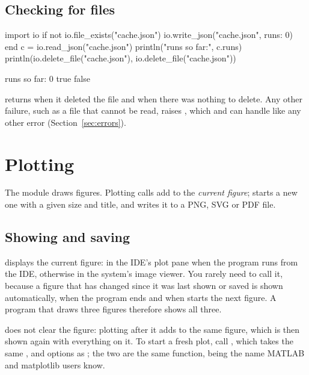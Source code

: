 \documentclass[11pt,a4paper,openany]{report}
\begin{document}
{{\section{Checking for files}

\begin{axon}
import io
if not io.file_exists("cache.json")
  io.write_json("cache.json", {runs: 0})
end
c = io.read_json("cache.json")
println("runs so far:", c.runs)
println(io.delete_file("cache.json"), io.delete_file("cache.json"))
\end{axon}
\begin{axonout}
runs so far: 0
true false
\end{axonout}

 returns  when it deleted the file and
 when there was nothing to delete. Any other failure, such as a
file that cannot be read, raises , which  and
 can handle like any other error (Section~\ref{sec:errors}).

\chapter{Plotting}\label{ch:plot}

The  module draws figures. Plotting calls add to the \emph{current
figure};  starts a new one with a given size and title, and
 writes it to a PNG, SVG or PDF file.

\section{Showing and saving}

 displays the current figure: in the IDE's plot pane when the
program runs from the IDE, otherwise in the system's image viewer. You rarely
need to call it, because a figure that has changed since it was last shown or
saved is shown automatically, when the program ends and when
 starts the next figure. A program that draws three figures
therefore shows all three.

 does not clear the figure: plotting after it adds to the
same figure, which is then shown again with everything on it. To start a fresh
plot, call , which takes the same ,
 and  options as ; the two are
the same function,  being the name MATLAB and matplotlib users
know.

}}
\end{document}
